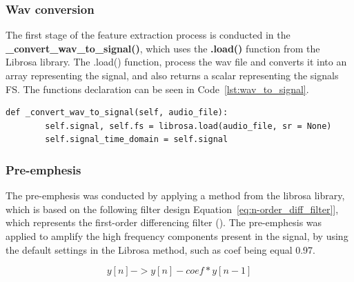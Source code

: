     \subsubsection{Wav conversion}
    The first stage of the feature extraction process is conducted in the\\
    \textbf{\_convert\_wav\_to\_signal()}, which uses the \textbf{.load()} function from the Librosa library. The .load() function, process the wav file and converts it into an array representing the signal, and also returns a scalar representing the signals FS. The functions declaration can be seen in Code~\ref{lst:wav_to_signal}.

    \begin{lstlisting}[style=pythonstyle, caption={The function used to convert the wav file into an array of samples}, label={lst:wav_to_signal}]
    def _convert_wav_to_signal(self, audio_file):
        self.signal, self.fs = librosa.load(audio_file, sr = None)
        self.signal_time_domain = self.signal
    \end{lstlisting}
    
    \subsubsection{Pre-emphesis}
        The pre-emphesis was conducted by applying a method from the librosa library, which is based on the following filter design Equation~\ref{eq:n-order_diff_filter}], which represents the first-order differencing filter (\cite{librosaPreemphasis}). The pre-emphesis was applied to amplify the high frequency components present in the signal, by using the default settings in the Librosa method, such as coef being equal 0.97.

    \begin{equation}
        \label{eq:n-order_diff_filter}
        y[n] -> y[n] - coef*y[n-1]
    \end{equation}

